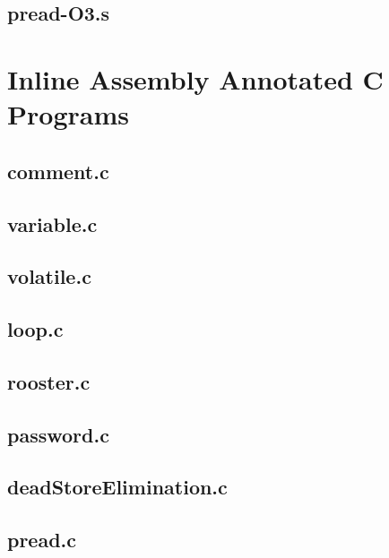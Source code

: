 \begin{appendices}
\subsection{pread-O3.s}


\section{Inline Assembly Annotated C Programs}
\label{app:InlineC}
\subsection{comment.c}


\subsection{variable.c}


\subsection{volatile.c}


\subsection{loop.c}


\subsection{rooster.c}


\subsection{password.c}


\subsection{deadStoreElimination.c}


\subsection{pread.c}



\end{appendices}
